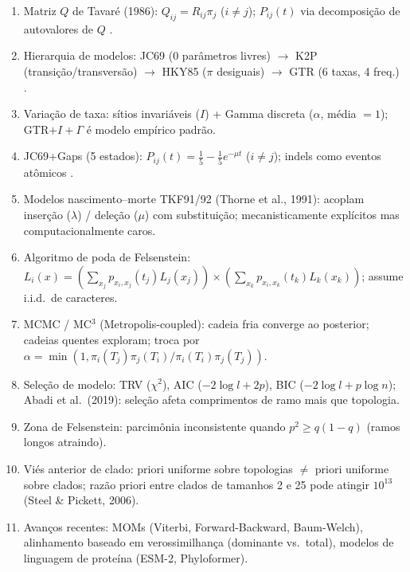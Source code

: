\clearpage
\begin{revise}
\begin{enumerate}
    \item Matriz $Q$ de Tavaré (1986): $Q_{ij}=R_{ij}\pi_j$ ($i\neq j$); $P_{ij}(t)$ via decomposição de autovalores de $Q$ \parencite{tavare1986,yang1994}.
    \item Hierarquia de modelos: JC69 (0 parâmetros livres) $\to$ K2P (transição/transversão) $\to$ HKY85 ($\pi$ desiguais) $\to$ GTR (6 taxas, 4 freq.) \parencite{swofford1996}.
    \item Variação de taxa: sítios invariáveis ($I$) + Gamma discreta ($\alpha$, média $=1$); GTR$+I+\Gamma$ é modelo empírico padrão.
    \item JC69+Gaps (5 estados): $P_{ij}(t)=\frac{1}{5}-\frac{1}{5}e^{-\mu t}$ ($i\neq j$); indels como eventos atômicos \parencite{wheeler2006}.
    \item Modelos nascimento--morte TKF91/92 (Thorne et al., 1991): acoplam inserção ($\lambda$) / deleção ($\mu$) com substituição; mecanisticamente explícitos mas computacionalmente caros.
    \item Algoritmo de poda de Felsenstein: $L_i(x)=\left(\sum_{x_j}p_{x_i,x_j}(t_j)L_j(x_j)\right)\!\times\!\left(\sum_{x_k}p_{x_i,x_k}(t_k)L_k(x_k)\right)$; assume i.i.d.\ de caracteres.
    \item MCMC / MC$^3$ (Metropolis-coupled): cadeia fria converge ao posterior; cadeias quentes exploram; troca por $\alpha=\min(1,\pi_i(T_j)\pi_j(T_i)/\pi_i(T_i)\pi_j(T_j))$.
    \item Seleção de modelo: TRV ($\chi^2$), AIC ($-2\log l+2p$), BIC ($-2\log l+p\log n$); Abadi et al.\ (2019): seleção afeta comprimentos de ramo mais que topologia.
    \item Zona de Felsenstein: parcimônia inconsistente quando $p^2\geq q(1-q)$ (ramos longos atraindo).
    \item Viés anterior de clado: priori uniforme sobre topologias $\neq$ priori uniforme sobre clados; razão priori entre clados de tamanhos 2 e 25 pode atingir $10^{13}$ (Steel \& Pickett, 2006).
    \item Avanços recentes: MOMs (Viterbi, Forward-Backward, Baum-Welch), alinhamento baseado em verossimilhança (dominante vs.\ total), modelos de linguagem de proteína (ESM-2, Phyloformer).
\end{enumerate}
\end{revise}

\clearpage

\printbibliography[heading=subbibliography,title={Referências}]

